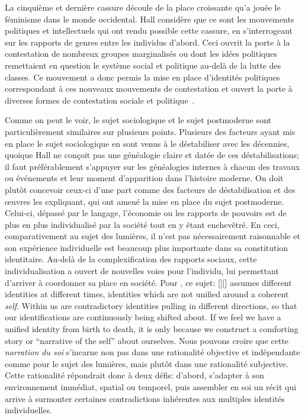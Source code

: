La cinquième et dernière cassure découle de la place croissante qu'a jouée le féminisme dans le monde occidental. 
Hall considère que ce sont les mouvements politiques et intellectuels qui ont rendu possible cette cassure, en s'interrogeant sur les rapports de genres entre les individus d'abord. 
Ceci ouvrit la porte à la contestation de nombreux groupes marginalisés ou dont les idées politiques remettaient en question le système social et politique au-delà de la lutte des classes. 
Ce mouvement a donc permis la mise en place d'identités politiques correspondant à ces nouveaux mouvements de contestation et ouvert la porte à diverses formes de contestation sociale et politique~\citeyearpar[610]{Hall1996a}.

Comme on peut le voir, le sujet sociologique et le sujet postmoderne sont particulièrement similaires sur plusieurs points. 
Plusieurs des facteurs ayant mis en place le sujet sociologique en sont venus à le déstabiliser avec les décennies, quoique Hall ne conçoit pas une généalogie claire et datée de ces déstabilisations; il faut préférablement s'appuyer sur les généalogies internes à chacun des travaux ou événements et leur moment d'apparition dans l'histoire moderne.
On doit plutôt concevoir ceux-ci d'une part comme des facteurs de déstabilisation et des œuvres les expliquant, qui ont amené la mise en place du sujet postmoderne. 
Celui-ci, dépassé par le langage, l'économie ou les rapports de pouvoirs est de plus en plus individualisé par la société tout en y étant enchevêtré. 
En ceci, comparativement au sujet des lumières, il n'est pas nécessairement raisonnable et son expérience individuelle est beaucoup plus importante dans sa constitution identitaire.
Au-delà de la complexification des rapports sociaux, cette individualisation a ouvert de nouvelles voies pour l'individu, lui permettant d'arriver à coordonner sa place en société. 
Pour \citeauthor{Hall1996a}, ce sujet: [{\citeyear[598]{Hall1996a}}][]{\textelp{} assumes different identities at different times, identities which are not unified around a coherent \emph{self}. Within us are contradictory identities pulling in different directions, so that our identifications are continuously being shifted about. If we feel we have a unified identity from birth to death, it is only because we construct a comforting story or ``narrative of the self'' about ourselves}. 
Nous pouvons croire que cette \emph{narration du soi} s'incarne non pas dans une rationalité objective et indépendante comme pour le sujet des lumières, mais plutôt dans une rationalité subjective. 
Cette rationalité répondrait donc à deux défis: d'abord, s'adapter à son environnement immédiat, spatial ou temporel, puis assembler en soi un récit qui arrive à surmonter certaines contradictions inhérentes aux multiples identités individuelles.

